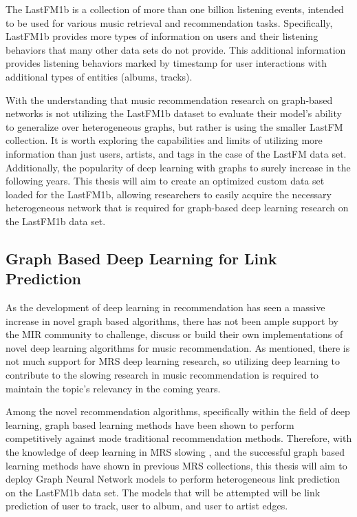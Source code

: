 The LastFM1b is a collection of more than one billion listening events, intended to be used for various music retrieval and recommendation tasks. Specifically, LastFM1b provides more types of information on users and their listening behaviors that many other data sets do not provide. This additional information provides listening behaviors marked by timestamp for user interactions with additional types of entities (albums, tracks). 

With the understanding that music recommendation research on graph-based networks is not utilizing the LastFM1b dataset to evaluate their model's ability to generalize over heterogeneous graphs, but rather is using the smaller LastFM collection. It is worth exploring the capabilities and limits of utilizing more information than just users, artists, and tags in the case of the LastFM data set. Additionally, the popularity of deep learning with graphs to surely increase in the following years. This thesis will aim to create an optimized custom data set loaded for the LastFM1b, allowing researchers to easily acquire the necessary heterogeneous network that is required for graph-based deep learning research on the LastFM1b data set.

\subsection{Graph Based Deep Learning for Link Prediction}
As the development of deep learning in recommendation has seen a massive increase in novel graph based algorithms,  there has not been ample support by the MIR community to challenge, discuss or build their own implementations of novel deep learning algorithms for music recommendation. \cite{Schedl2022} \cite{Gao22} As mentioned, there is not much support for MRS deep learning research, so utilizing deep learning to contribute to the slowing research in music recommendation is required to maintain the topic's relevancy in the coming years. 

Among the novel recommendation algorithms, specifically within the field of deep learning, graph based learning methods have been shown to perform competitively against mode traditional recommendation methods.\cite{Gao2021} Therefore, with the knowledge of deep learning in MRS slowing \cite{Schedl2022}, and the successful graph based learning methods have shown in previous MRS collections, this thesis will aim to deploy Graph Neural Network models to perform heterogeneous link prediction on the LastFM1b data set. The models that will be attempted will be link prediction of user to track, user to album, and user to artist edges. 

